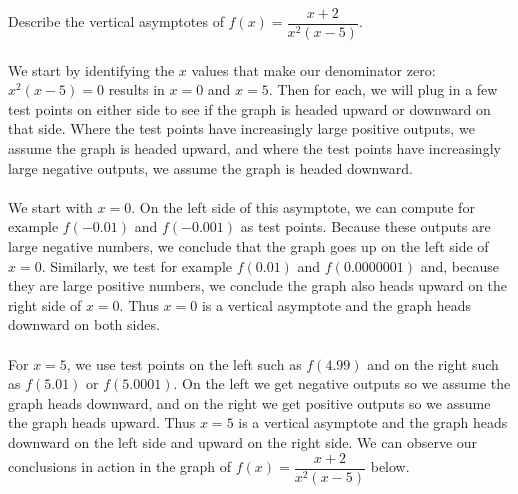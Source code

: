 \documentclass{ximera}
\begin{document}
\begin{example}
Describe the vertical asymptotes of $f(x)=\dfrac{x+2}{x^2(x-5)}$.
\\
\\We start by identifying the $x$ values that make our denominator zero: $x^2(x-5)=0$ results in $x=0$ and $x=5$. Then for each, we will plug in a few test points on either side to see if the graph is headed upward or downward on that side. Where the test points have increasingly large positive outputs, we assume the graph is headed upward, and where the test points have increasingly large negative outputs, we assume the graph is headed downward.
\\
\\We start with $x=0$. On the left side of this asymptote, we can compute for example $f(-0.01)$ and $f(-0.001)$ as test points. Because these outputs are large negative numbers, we conclude that the graph goes up on the left side of $x=0$. Similarly, we test for example $f(0.01)$ and $f(0.0000001)$ and, because they are large positive numbers, we conclude the graph also heads upward on the right side of $x=0$. Thus $x=0$ is a vertical asymptote and the graph heads downward on both sides.
\\
\\For $x=5$, we use test points on the left such as $f(4.99)$ and on the right such as $f(5.01)$ or $f(5.0001)$. On the left we get negative outputs so we assume the graph heads downward, and on the right we get positive outputs so we assume the graph heads upward. Thus $x=5$ is a vertical asymptote and the graph heads downward on the left side and upward on the right side. We can observe our conclusions in action in the graph of $f(x)=\dfrac{x+2}{x^2(x-5)}$ below.

\begin{center}\end{center}
\end{example}
\end{document}
